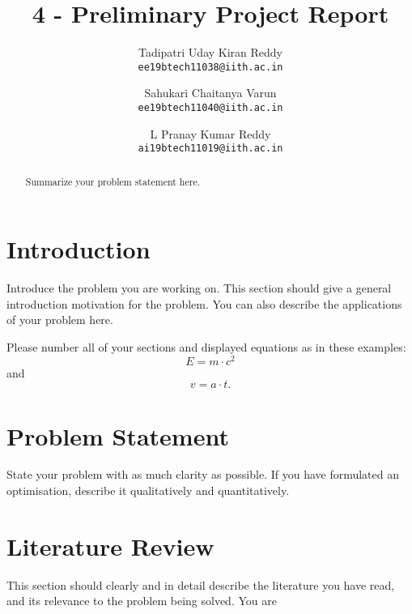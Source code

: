 \documentclass[10pt,twocolumn,letterpaper]{article}
\begin{document}
\title{4  - Preliminary Project Report}

\author{Tadipatri Uday Kiran Reddy\\
{\tt\small ee19btech11038@iith.ac.in}
\and
Sahukari Chaitanya Varun\\
{\tt\small ee19btech11040@iith.ac.in}
\and
L Pranay Kumar Reddy\\
{\tt\small ai19btech11019@iith.ac.in}
}
\maketitle

\begin{abstract}
Summarize your problem statement here.
\end{abstract}

\section{Introduction}
\label{sec:intro}
Introduce the problem you are working on. This section should give a general introduction motivation for the problem. You can also describe the applications of your problem here. 

Please number all of your sections and displayed equations as in these examples:
\begin{equation}
  E = m\cdot c^2
  \label{eq:important}
\end{equation}
and
\begin{equation}
  v = a\cdot t.
  \label{eq:also-important}
\end{equation}
\section{Problem Statement}
\label{sec:problem}
State your problem with as much clarity as possible. If you have formulated an optimisation, describe it qualitatively and quantitatively.

\section{Literature Review}
\label{sec:literature}
This section should clearly and in detail describe the literature you have read, and its relevance to the problem being solved. You are 
\end{document}
